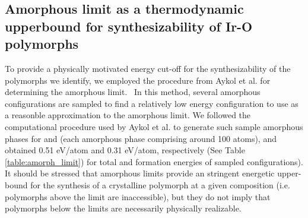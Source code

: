 \subsection{Amorphous limit as a thermodynamic upperbound for synthesizability of Ir-O polymorphs}
%

%
%
To provide a physically motivated energy cut-off for the synthesizability of the polymorphs we identify, we employed the procedure from Aykol et al. for determining the amorphous limit.~\cite{Aykol2018}
%
In this method, several amorphous configurations are sampled to find a relatively low energy configuration to use as a reasonble approximation to the amorphous limit.
%
We followed the computational procedure used by Aykol et al. to generate such sample amorphous phases for \IrOtwo and \IrOthree
(each amorphous phase comprising around 100 atoms),
and obtained 0.51 eV/atom and 0.31 eV/atom, respectively
(See Table \ref{table:amorph_limit}) for total and formation energies of sampled configurations).
%
It should be stressed that amorphous limits provide an stringent energetic upper-bound for the synthesis of a crystalline polymorph at a given composition (i.e. polymorphs above the limit are inaccessible),
but they do not imply that polymorphs below the limits are necessarily physically realizable.



\begin{table}
\centering
\caption{\label{table:amorph_limit}
%
Density functional thoery computed energetics of sampled amorphous phases for \IrOtwo and \IrOthree as per the procedure of Aykol ~\cite{Aykol2018}.
%
Here we report the raw DFT electronic energy per atom ($E_{DFT}$),
the enthalpy of formation (\DHf),
and the energy above the hull relative to the most stable polymorph of each stoichiometry (\rIrOtwo and \aIrOthree).
%
The most stable amorphous phase for each stoichiometry is bolded.
}

\end{table}





